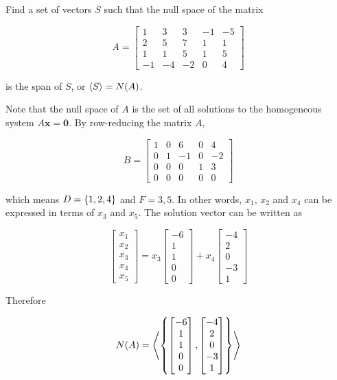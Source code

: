 \documentclass[a4paper,12pt]{article}
\begin{document}
\begin{exm}
  Find a set of vectors $S$ such that the null space of the matrix

  $$A=\begin{bmatrix}
    1 & 3 & 3 & -1 & -5\\
    2 & 5 & 7 & 1 & 1\\
    1 & 1 & 5 & 1 & 5\\
    -1 & -4 & -2 & 0 & 4
  \end{bmatrix}$$\s

  is the span of $S$, or $\left\langle S\right\rangle=N(A)$.\n

  \ans Note that the null space of $A$ is the set of all solutions to the homogeneous system $A\mathbf{x}=\mathbf{0}$. By row-reducing the matrix $A$,

  $$B=\begin{bmatrix}
    1 & 0 & 6 & 0 & 4\\
    0 & 1 & -1 & 0 & -2\\
    0 & 0 & 0 & 1 & 3\\
    0 & 0 & 0 & 0 & 0
  \end{bmatrix}$$\s

  which means $D=\left\{ 1,2,4\right\}$ and $F={3,5}$. In other words, $x_{1}$, $x_{2}$ and $x_{4}$ can be expressed in terms of $x_{3}$ and $x_{5}$. The solution vector can be written as

  $$\begin{bmatrix}
    x_{1}\\
    x_{2}\\
    x_{3}\\
    x_{4}\\
    x_{5}
  \end{bmatrix}=x_{3}\begin{bmatrix}
    -6\\
    1\\
    1\\
    0\\
    0
  \end{bmatrix}+x_{4}\begin{bmatrix}
    -4\\
    2\\
    0\\
    -3\\
    1
  \end{bmatrix}$$\s

  Therefore

  $$N(A)=\left\langle \left\{ \begin{bmatrix}
    -6\\
    1\\
    1\\
    0\\
    0
  \end{bmatrix},\begin{bmatrix}
    -4\\
    2\\
    0\\
    -3\\
    1
  \end{bmatrix}\right\}\right\rangle$$
\end{exm}
\end{document}
